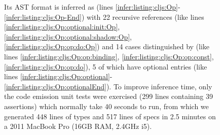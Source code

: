 \begin{figure}
{         %
         Its AST format is inferred as  (lines \ref{infer:listing:cljs:Op}-\ref{infer:listing:cljs:Op-End})
         with 22 recursive references
         (like lines \ref{infer:listing:cljs:Op:optional:init:Op}, \ref{infer:listing:cljs:Op:optional:shadow:Op}, \ref{infer:listing:cljs:Op:op:do:Op})
         and 14 cases distinguished by  (like lines \ref{infer:listing:cljs:Op:op:binding},
         \ref{infer:listing:cljs:Op:op:const}, \ref{infer:listing:cljs:Op:op:do}),
         5 of which have optional entries (like lines \ref{infer:listing:cljs:Op:optional}-\ref{infer:listing:cljs:Op:optionalEnd}).
         To improve inference time,
         only the code emission unit tests were exercised (299 lines containing 39 assertions)
         which normally take 40 seconds to run, from which we
         generated 448 lines of types and 517 lines of specs
         in 2.5 minutes on a 2011 MacBook Pro (16GB RAM, 2.4GHz i5).
}
\label{infer:fig:cljs}

\end{figure}
